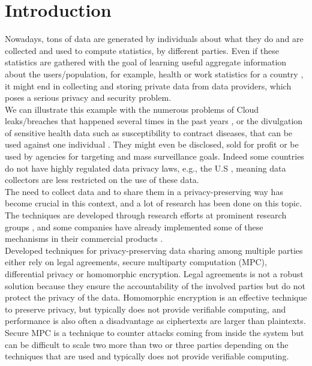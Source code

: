 \documentclass{article}
\begin{document}
\section{Introduction}
Nowadays, tons of data are generated by individuals about what they do and are collected and used to compute statistics, by different parties. Even if these statistics are gathered with the goal of learning useful aggregate information about the users/population, for example, health or work statistics for a country \cite{swiss}, it might end in collecting and storing private data from data providers, which poses a serious privacy and security problem.\\
We can illustrate this example with the numerous problems of Cloud leaks/breaches that happened several times in the past years \cite{pentagon}, or the divulgation of sensitive health data such as susceptibility to contract diseases, that can be used against one individual \cite{sell}. They might even be disclosed, sold for profit \cite{sold} or be used by agencies for targeting and mass surveillance goals. Indeed some countries do not have highly regulated data privacy laws, e.g., the U.S \cite{law}, meaning data collectors are less restricted on the use of these data.\\
The need to collect data and to share them in a privacy-preserving way has become crucial in this context, and a lot of research has been done on this topic.\\
The techniques are developed through research efforts at prominent research groups \cite{unlynx,prio}, and some companies have already implemented some of these mechanisms in their commercial products \cite{apple}.\\
Developed techniques for privacy-preserving data sharing among multiple parties either rely on legal agreements, secure multiparty computation (MPC), differential privacy or homomorphic encryption.
Legal agreements is not a robust solution because they ensure the accountability of the involved parties but do not protect the privacy of the data.
Homomorphic encryption is an effective technique to preserve privacy, but typically does not provide verifiable computing, and performance is also often a disadvantage as ciphertexts are larger than plaintexts.\\
Secure MPC is a technique to counter attacks coming from inside the system but can be difficult to scale two more than two or three parties depending on the techniques that are used and typically does not provide verifiable computing.\\
\end{document}
